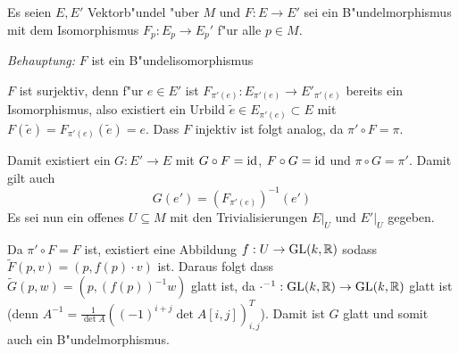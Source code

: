 \begin{Loes}
Es seien $E, E'$ Vektorb"undel "uber $M$ und $F: E \to E'$ sei ein B"undelmorphismus mit dem Isomorphismus $F_p: E_p \to E_p'$ f"ur alle $p \in M$.

\emph{Behauptung:} $F$ ist ein B"undelisomorphismus

$F$ ist surjektiv, denn f"ur $e \in E'$ ist $F_{\pi'(e)}: E_{\pi'(e)} \to E'_{\pi'(e)}$ bereits ein Isomorphismus, also existiert ein Urbild $\tilde e \in E_{\pi'(e)} \subset E$ mit $F(\tilde e) = F_{\pi'(e)}(\tilde e) = e$. Dass $F$ injektiv ist folgt analog, da $\pi' \circ F = \pi$.

Damit existiert ein $G: E' \to E$ mit $G \circ F = \operatorname{id}$, $F \circ G = \operatorname{id}$ und $\pi \circ G = \pi'$. Damit gilt auch
	\[ G(e') = (F_{\pi'(e)})^{-1}(e') \]
Es sei nun ein offenes $U  \subseteq M$ mit den Trivialisierungen $E|_U$ und $E'|_U$ gegeben.
\begin{center}\end{center}
Da $\pi' \circ F = F$ ist, existiert eine Abbildung $f: U \to \operatorname{GL}(k, \operatorname{\mathbb{R}})$ sodass $\tilde F(p,v) = (p, f(p) \cdot v)$ ist. Daraus folgt dass $\tilde G(p,w) = (p, (f(p))^{-1}w)$ glatt ist, da $\cdot^{-1}: \operatorname{GL}(k,\operatorname{\mathbb{R}}) \to \operatorname{GL}(k, \operatorname{\mathbb{R}})$ glatt ist (denn $A^{-1} = \frac{1}{\det A}((-1)^{i+j} \det A[i,j])_{i,j}^T$). Damit ist $G$ glatt und somit auch ein B"undelmorphismus.
\end{Loes}

